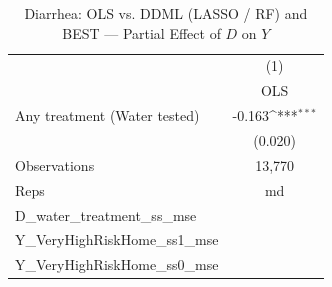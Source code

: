 \begin{table}[htbp]\centering
\def\sym#1{\ifmmode^{#1}\else\(^{#1}\)\fi}
\caption{Diarrhea: OLS vs. DDML (LASSO / RF) and BEST — Partial Effect of $D$ on $Y$}
\begin{tabular}{l*{1}{c}}
\toprule
                &\multicolumn{1}{c}{(1)}\\
                &\multicolumn{1}{c}{OLS}\\
\midrule
Any treatment (Water tested)&   -0.163\sym{***}\\
                &  (0.020)         \\
\midrule
Observations    &   13,770         \\
Reps            &       md         \\
D\_water\_treatment\_ss\_mse&                  \\
Y\_VeryHighRiskHome\_ss1\_mse&                  \\
Y\_VeryHighRiskHome\_ss0\_mse&                  \\
\bottomrule
\end{tabular}
\end{table}

